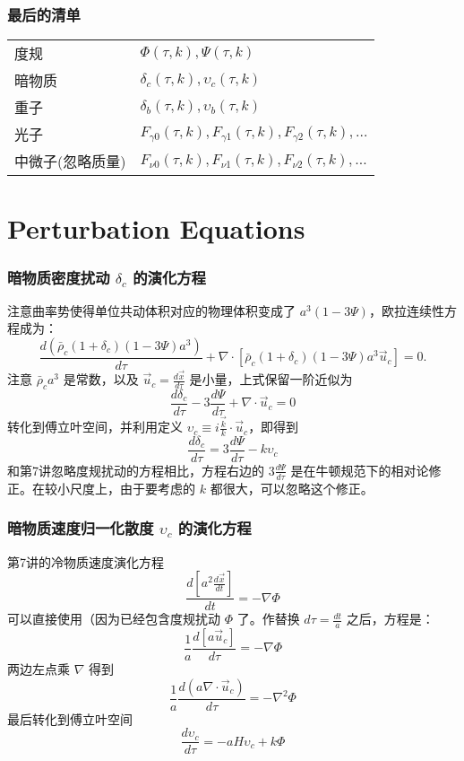 \documentclass[CJK,13pt]{beamer}
\begin{document}
    
    \begin{frame}
    \frametitle{最后的清单}
    \begin{tabular}{ll}
    度规 & $\Phi(\tau, k), \Psi(\tau, k)$ \\
    暗物质 & $\delta_c(\tau, k), \upsilon_c(\tau, k)$ \\
    重子 & $\delta_b(\tau, k), \upsilon_b(\tau, k)$ \\
    光子 & $F_{\gamma 0}(\tau, k), F_{\gamma 1}(\tau, k), F_{\gamma 2}(\tau, k), \ldots $ \\
    中微子(忽略质量) & $F_{\nu 0}(\tau, k), F_{\nu 1}(\tau, k), F_{\nu 2}(\tau, k), \ldots $
    \end{tabular}
    \end{frame}

    \section{Perturbation Equations}


    \begin{frame}
      \frametitle{暗物质密度扰动 $\delta_c$ 的演化方程}
      注意曲率势使得单位共动体积对应的物理体积变成了 $a^3(1-3\Psi)$，欧拉连续性方程成为：
      $$\frac{d\left(\bar{\rho}_c(1+\delta_c)(1-3\Psi)a^3\right)}{d\tau} + \nabla\cdot\left[\bar{\rho}_c(1+\delta_c)(1-3\Psi)a^3 \vec{u}_c\right] = 0.$$
      注意 $\bar{\rho}_c a^3$ 是常数，以及 $\vec{u}_c = \frac{d\vec{x}}{d\tau}$ 是小量，上式保留一阶近似为
      $$ \frac{d\delta_c}{d\tau} - 3\frac{d\Psi}{d\tau} + \nabla\cdot \vec{u}_c = 0 $$
      转化到傅立叶空间，并利用定义 $\upsilon_c\equiv i\frac{\vec{k}}{k}\cdot\vec{u}_c$，即得到
      {\blue      $$ \frac{d\delta_c}{d\tau} = 3\frac{d\Psi}{d\tau} - k\upsilon_c $$}
      和第7讲忽略度规扰动的方程相比，方程右边的 $3\frac{d\Psi}{d\tau}$ 是在牛顿规范下的相对论修正。在较小尺度上，由于要考虑的 $k$ 都很大，可以忽略这个修正。
    \end{frame}
    

    \begin{frame}
      \frametitle{暗物质速度归一化散度 $\upsilon_c$ 的演化方程}
      第7讲的冷物质速度演化方程
      $$\frac{d\left[a^2\frac{d\vec{x}}{dt}\right]}{dt} = -\nabla\Phi$$
      可以直接使用（因为已经包含度规扰动 $\Phi$ 了。作替换 $d\tau = \frac{dt}{a}$ 之后，方程是：
        $$\frac{1}{a}\frac{d\left[a\vec{u}_c\right]}{d\tau} = -\nabla\Phi$$
        两边左点乘 $\nabla$ 得到
        $$\frac{1}{a}\frac{d(a\nabla\cdot \vec{u}_c)}{d\tau} = -\nabla^2\Phi $$
        最后转化到傅立叶空间
        {\blue $$ \frac{d\upsilon_c}{d\tau} = -aH\upsilon_c  + k \Phi $$}       
    \end{frame}
\end{document}
